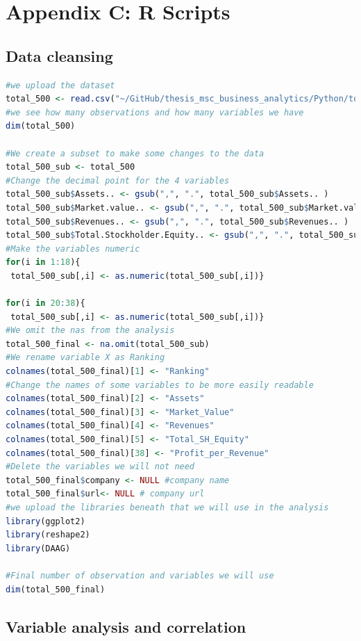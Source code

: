 \documentclass{book}
\begin{document}
\newpage
\section{Appendix C: R Scripts} \label{appR}
\subsection{Data cleansing}\label{r:data cleansing}
\begin{lstlisting}[language=R]
#we upload the dataset
total_500 <- read.csv("~/GitHub/thesis_msc_business_analytics/Python/total_500_new.csv", sep=";", na.strings="n/a")
#we see how many observations and how many variables we have
dim(total_500)

#We create a subset to make some changes to the data
total_500_sub <- total_500
#Change the decimal point for the 4 variables
total_500_sub$Assets.. <- gsub(",", ".", total_500_sub$Assets.. )
total_500_sub$Market.value.. <- gsub(",", ".", total_500_sub$Market.value.. )
total_500_sub$Revenues.. <- gsub(",", ".", total_500_sub$Revenues.. )
total_500_sub$Total.Stockholder.Equity.. <- gsub(",", ".", total_500_sub$Total.Stockholder.Equity.. )
#Make the variables numeric
for(i in 1:18){
 total_500_sub[,i] <- as.numeric(total_500_sub[,i])}  
 
for(i in 20:38){
 total_500_sub[,i] <- as.numeric(total_500_sub[,i])} 
#We omit the nas from the analysis
total_500_final <- na.omit(total_500_sub)
#We rename variable X as Ranking
colnames(total_500_final)[1] <- "Ranking"
#Change the names of some variables to be more easily readable
colnames(total_500_final)[2] <- "Assets"
colnames(total_500_final)[3] <- "Market_Value"
colnames(total_500_final)[4] <- "Revenues"
colnames(total_500_final)[5] <- "Total_SH_Equity"
colnames(total_500_final)[38] <- "Profit_per_Revenue"
#Delete the variables we will not need
total_500_final$company <- NULL #company name
total_500_final$url<- NULL # company url
#we upload the libraries beneath that we will use in the analysis
library(ggplot2)
library(reshape2)
library(DAAG)

#Final number of observation and variables we will use
dim(total_500_final)
\end{lstlisting}

\subsection{Variable analysis and correlation}
\end{document}
